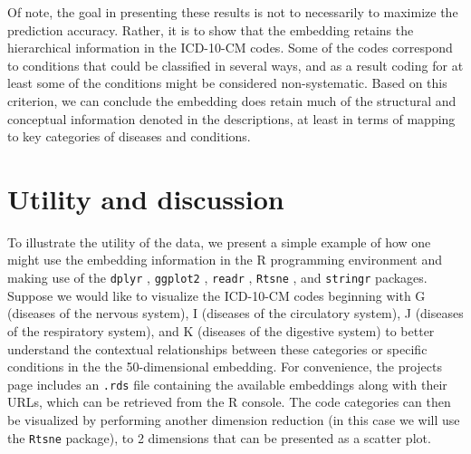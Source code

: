 \documentclass{bmcart}
\begin{document}
Of note, the goal in presenting these results is not to necessarily to 
maximize the prediction accuracy. Rather, it is to show that the embedding 
retains the
hierarchical information in the ICD-10-CM codes. Some of the codes correspond to
conditions that could be classified in several ways, and as a result coding
for at least some of the conditions might be considered non-systematic.
Based on this criterion, we can conclude the embedding does retain much of the 
structural and conceptual information denoted in the descriptions, at least in 
terms of mapping to key categories of diseases and conditions.

\section*{Utility and discussion}

To illustrate the utility of the data, we present a simple example of how one 
might use the embedding information in the R programming environment and
making use of the \texttt{dplyr} \cite{dplyr}, \texttt{ggplot2} \cite{ggplot2}, 
\texttt{readr} \cite{readr}, \texttt{Rtsne} \cite{Rtsne}, and 
\texttt{stringr} \cite{stringr} packages. Suppose 
we would like to 
visualize the ICD-10-CM codes beginning with 
G (diseases of the nervous system), 
I (diseases of the circulatory system), J (diseases of the respiratory system), 
and K (diseases of the digestive system) to better understand the 
contextual relationships
between these categories or specific conditions in the the 50-dimensional 
embedding. For convenience, the projects page includes an \texttt{.rds} file
containing the available embeddings along with their URLs, which can be 
retrieved from the R console. The code categories can then be visualized 
by performing another dimension reduction (in this case we will use the
\texttt{Rtsne} package), to 2 dimensions that can be presented as a scatter plot.

\vspace{2mm}
\end{document}

